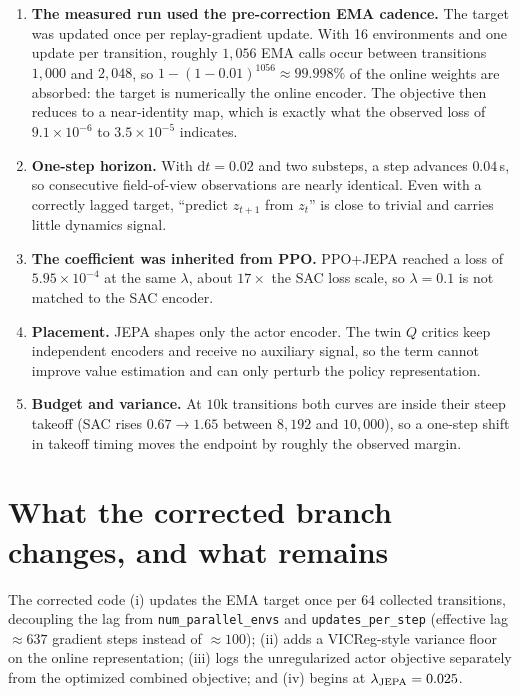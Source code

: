 \documentclass[11pt]{article}
\newcommand{\code}[1]{\texttt{#1}}
\begin{document}
\begin{enumerate}
\item \textbf{The measured run used the pre-correction EMA cadence.} The target
was updated once per replay-gradient update. With 16 environments and one
update per transition, roughly $1{,}056$ EMA calls occur between transitions
$1{,}000$ and $2{,}048$, so $1-(1-0.01)^{1056}\approx 99.998\%$ of the online
weights are absorbed: the target is numerically the online encoder. The
objective then reduces to a near-identity map, which is exactly what the
observed loss of $9.1\times10^{-6}$ to $3.5\times10^{-5}$ indicates.
\item \textbf{One-step horizon.} With $\mathrm{d}t=0.02$ and two substeps, a
step advances $0.04$\,s, so consecutive field-of-view observations are nearly
identical. Even with a correctly lagged target, ``predict $z_{t+1}$ from
$z_t$'' is close to trivial and carries little dynamics signal.
\item \textbf{The coefficient was inherited from PPO.} PPO+JEPA reached a loss
of $5.95\times10^{-4}$ at the same $\lambda$, about $17\times$ the SAC loss
scale, so $\lambda=0.1$ is not matched to the SAC encoder.
\item \textbf{Placement.} JEPA shapes only the actor encoder. The twin $Q$
critics keep independent encoders and receive no auxiliary signal, so the term
cannot improve value estimation and can only perturb the policy
representation.
\item \textbf{Budget and variance.} At $10$k transitions both curves are inside
their steep takeoff (SAC rises $0.67\rightarrow1.65$ between $8{,}192$ and
$10{,}000$), so a one-step shift in takeoff timing moves the endpoint by
roughly the observed margin.
\end{enumerate}

\section{What the corrected branch changes, and what remains}

The corrected code (i) updates the EMA target once per $64$ collected
transitions, decoupling the lag from \code{num\_parallel\_envs} and
\code{updates\_per\_step} (effective lag $\approx 637$ gradient steps instead
of $\approx 100$); (ii) adds a VICReg-style variance floor on the online
representation; (iii) logs the unregularized actor objective separately from
the optimized combined objective; and (iv) begins at $\lambda_{\rm JEPA}=0.025$.
\end{document}

